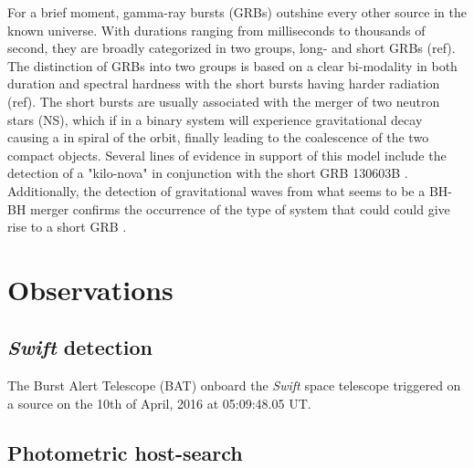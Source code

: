 \documentclass[a4paper,fleqn,usenatbib]{mnras}
\begin{document}
For a brief moment, gamma-ray bursts (GRBs) outshine every other source in the
known universe. With durations ranging from milliseconds to thousands of second,
they are broadly categorized in two groups, long- and short GRBs (ref). The
distinction of GRBs into two groups is based on a clear bi-modality in both
duration and spectral hardness with the short bursts having harder radiation
(ref). The short bursts are usually associated with the merger of two neutron
stars (NS), which if in a binary system will experience gravitational decay
causing a in spiral of the orbit, finally leading to the coalescence of the two
compact objects. Several lines of evidence in support of this model include the
detection of a "kilo-nova" in conjunction with the short GRB 130603B
\citep{Tanvir2013, Berger2013}. Additionally, the detection of gravitational
waves from what seems to be a BH-BH merger confirms the occurrence of the type
of system that could could give rise to a short GRB  \citep{Abbott2016}.
%

\section{Observations}
\label{sec:Methods} %

\subsection{\textit{Swift} detection}
The Burst Alert Telescope (BAT) onboard the \textit{Swift} space telescope
\citep{Gehrels2004} triggered on a source on the 10th of April, 2016 at
05:09:48.05 UT. 

\cite{Norris2011}

\subsection{Photometric host-search}
\end{document}
